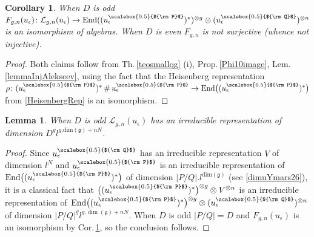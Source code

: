 \documentclass[11pt]{amsart}
\newtheorem{lem}[teo]{Lemma}
\newtheorem{cor}[teo]{Corollary}
\newcommand{\e}{\epsilon}
\newcommand{\Q}{{\scalebox{0.5}{${\rm Q}$}}}
\newcommand{\Pup}{{\scalebox{0.5}{${\rm P}$}}}
\begin{document}
\begin{cor}\label{cor24mars26} When $D$ is odd $F_{g,n}(u_\e)\colon \mathcal{L}_{g,n}(u_\epsilon)\to {\rm End}((u_\epsilon^\Pup)^*)^{\otimes g} \otimes (u_\epsilon^\Q)^{\otimes n}$ is an isomorphism of algebras. When $D$ is even $F_{g,n}$ is not surjective (whence not injective). %
\end{cor}
\begin{proof} Both claims follow from Th.\,\ref{teosmallqg} (i), Prop.\,\ref{Phi10image}, Lem.\,\ref{lemmaInjAlekseev}, using the fact that the Heisenberg representation $\rho\colon (u_\e^\Pup)^*  \,\#\, u_\e^\Pup \to {\rm End}\bigl( (u_\e^\Pup)^* \bigr)$ from \eqref{HeisenbergRep} is an isomorphism.
\end{proof}

\begin{lem}\label{irrepeD} When $D$ is odd $\mathcal{L}_{g,n}(u_\epsilon)$ has an irreducible representation of dimension $D^gl^{g.\mathrm{dim}(\mathfrak{g})+nN}$.
\end{lem}
\begin{proof} Since $u_\e^\Q$ has an irreducible representation $V$ of dimension $l^N$ \cite[\S III.6.6]{BG} and $u_\e^\Pup$ is an irreducible representation of ${\rm End}\bigl( (u_\epsilon^\Pup)^* \bigr)$ of dimension $\vert P/Q\vert.l^{\mathrm{dim}(\mathfrak{g})}$ (see \eqref{dimuYmars26}), it is a classical fact \cite[Thm.\,3.10.2]{Et} that $\bigl( (u_\epsilon^\Pup)^* \bigr)^{\otimes g} \otimes V^{\otimes n}$ is an irreducible representation of ${\rm End}\bigl( (u_\epsilon^\Pup)^* \bigr)^{\otimes g} \otimes (u_\epsilon^\Q)^{\otimes n}$ of dimension $\vert P/Q\vert^gl^{g.\dim(\mathfrak{g})+nN}$. When $D$ is odd $\vert P/Q\vert = D$ and $F_{g,n}(u_\e)$ is an isomorphism by Cor.\,\ref{cor24mars26}, so the conclusion follows.
\end{proof}
\end{document}
